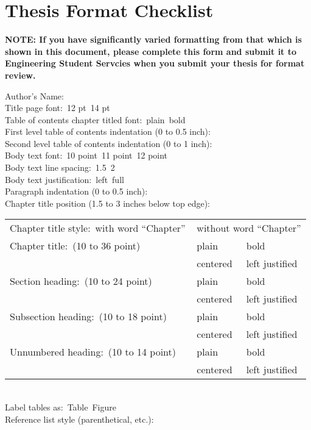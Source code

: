 \chapter{Thesis Format Checklist}

\newcommand{\smallblank}{\underline{\hspace{0.25in}}\,}
\newcommand{\largeblank}{\underline{\hspace{0.75in}}\,}

{\footnotesize \textbf{NOTE: If you have significantly varied formatting from that
which is shown in this document, please complete this form and submit it to
Engineering Student Servcies when you submit your thesis for format review.}}

Author's Name:  \underline{\hspace{4.0in}} \\
Title page font:  \smallblank 12 pt \indent \smallblank 14 pt \\
Table of contents chapter titled font: \smallblank plain \indent \smallblank bold \\
First level table of contents indentation (0 to 0.5 inch): \largeblank \\  
Second level table of contents indentation (0 to 1 inch): \largeblank \\
Body text font: \smallblank 10 point \quad \smallblank 11 point \quad \smallblank 12 point \\
Body text line spacing: \smallblank 1.5 \quad \smallblank 2 \indent \\
Body text justification: \smallblank left \quad \smallblank full \\
Paragraph indentation (0 to 0.5 inch):  \largeblank \\
Chapter title position (1.5 to 3 inches below top edge):  \largeblank \\
\begin{tabular}{@{}lll}
Chapter title style: \smallblank with word ``Chapter'' & \multicolumn{2}{l}{\smallblank without word ``Chapter''} \\
Chapter title:  \smallblank (10 to 36 point) & \smallblank plain & \smallblank bold \\
& \smallblank centered & \smallblank left justified \\
Section heading: \smallblank (10 to 24 point) & \smallblank plain & \smallblank bold \\
& \smallblank centered & \smallblank left justified \\
Subsection heading:  \smallblank (10 to 18 point) & \smallblank plain & \smallblank bold \\
& \smallblank centered & \smallblank left justified \\
Unnumbered heading: \smallblank (10 to 14 point) & \smallblank plain & \smallblank bold \\
& \smallblank centered & \smallblank left justified
\end{tabular} \\
Label tables as: \smallblank Table \quad \smallblank Figure \\
Reference list style (parenthetical, etc.): \underline{\hspace{3.0in}}

